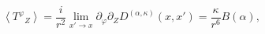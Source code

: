 \begin{equation}
\left<T^{\varphi}{}_{Z}\right> = \frac{i}{r^2}\lim_{x'\rightarrow x}
\partial_{\varphi}\partial_{Z}D^{(\alpha,\kappa)}(x,x')
= \frac{\kappa}{r^6} B(\alpha),
\label{t23}
\end{equation}


